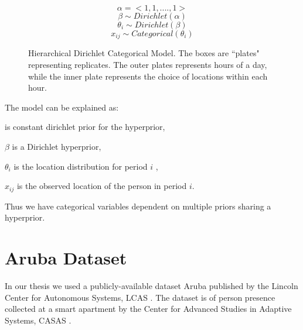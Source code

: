 \documentclass[12pt,parskip=half, DIV=calc, BCOR=10mm, x11names]{scrbook}
\begin{document}
\noindent
\begin{figure}[htp]

\begin{minipage}{0.3\textwidth}
\centering


\end{minipage}%
\begin{minipage}{0.7\textwidth}

\begin{equation*}
	\alpha = <1, 1, .... , 1 > 
\end{equation*}
\begin{equation*}
	\beta \sim Dirichlet(\alpha)
\end{equation*}
\begin{equation*}
	\theta_i  \sim Dirichlet(\beta)
\end{equation*}
\begin{equation*}
	x_{ij} \sim Categorical(\theta_i)
\end{equation*}
\end{minipage}
\caption{Hierarchical Dirichlet Categorical Model. The boxes are ``plates" representing replicates. The outer plates represents hours of a day, while the inner plate represents the choice of locations within each hour.}
\label{hdcm}
\end{figure}

The model can be explained as:

	\boldmath{$\alpha$} is  constant dirichlet prior for the hyperprior, 
	
	$\beta$ is a Dirichlet hyperprior,
	
	$\theta_i$ is the location distribution for period $i$  ,
	
	$x_{ij}$ is the observed location of the person in period $i$.
	
Thus we have categorical variables dependent on multiple priors sharing a hyperprior.


\section{Aruba Dataset}
In our thesis we used a  publicly-available  dataset  Aruba published by the Lincoln Center for Autonomous Systems, LCAS . The dataset is of person presence collected at a smart apartment by the Center for Advanced Studies in Adaptive Systems, CASAS .
\end{document}
